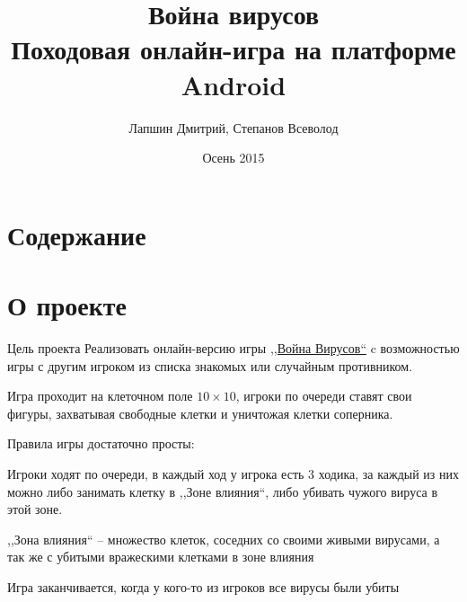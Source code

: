 \documentclass{beamer}
\title[Война вирусов]{Война вирусов\\Походовая онлайн-игра на платформе Android}
\author{Лапшин Дмитрий, Степанов Всеволод}
\institute{СПб АУ РАН}
\date{Осень 2015}
\makeatletter
\newcommand*{\currentname}{\@currentlabelname}
\newcommand{\cimg}[2]{%
    \begin{center}%
        \ifthenelse{\equal{#2}{}}{%
            \texttt{[image: \#1]}
        }{%
            \texttt{[image: \#1]}
        }%
    \end{center}%
}
\makeatother
\begin{document}
\begin{frame}
    \titlepage
\end{frame}

\section{Содержание}

\begin{frame}[t]{\currentname}
    \tableofcontents
\end{frame}

\section{О проекте}

\begin{frame}[t]{Цель проекта}
    Реализовать онлайн-версию игры
    \href{https://ru.wikipedia.org/wiki/\%D0\%92\%D0\%BE\%D0\%B9\%D0\%BD\%D0\%B0\_\%D0\%B2\%D0\%B8\%D1\%80\%D1\%83\%D1\%81\%D0\%BE\%D0\%B2}{,,Война Вирусов``}
    c возможностью игры с другим игроком из списка знакомых или случайным противником.

    Игра проходит на клеточном поле $10 \times 10$, игроки по очереди ставят свои фигуры, захватывая свободные клетки и уничтожая клетки соперника.
    
    \pause
    Правила игры достаточно просты: 
    
    Игроки ходят по очереди, в каждый ход у игрока есть 3 ходика, за каждый из них можно либо занимать клетку в ,,Зоне влияния``, либо убивать чужого вируса в этой зоне.
    
    ,,Зона влияния`` -- множество клеток, соседних со своими живыми вирусами, а так же с убитыми вражескими клетками в зоне влияния
    
\end{frame}

\begin{frame}[t]{\currentname}
    Игра заканчивается, когда у кого-то из игроков все вирусы были убиты

    \cimg{01.png}{0.4}
\end{frame}
\end{document}
